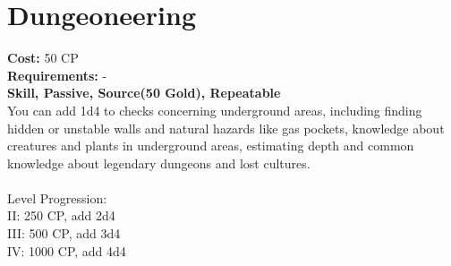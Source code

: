 \section{Dungeoneering}
\textbf{Cost:} 50 CP\\
\textbf{Requirements:} -\\
\textbf{Skill, Passive, Source(50 Gold), Repeatable}\\
You can add 1d4 to checks concerning underground areas, including finding hidden or unstable walls and natural hazards like gas pockets, knowledge about creatures and plants in underground areas, estimating depth and common knowledge about legendary dungeons and lost cultures.\\
\\
Level Progression:\\
II: 250 CP, add 2d4\\
III: 500 CP, add 3d4\\
IV: 1000 CP, add 4d4\\